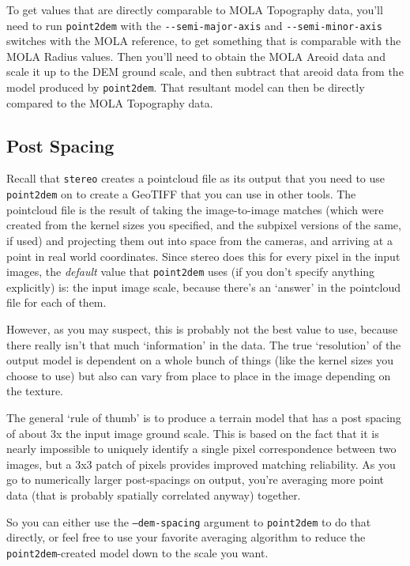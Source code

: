 To get values that are directly comparable to MOLA Topography data,
you'll need to run \texttt{point2dem} with the \texttt{-\/-semi-major-axis}
and \texttt{-\/-semi-minor-axis} switches with the MOLA reference, to get
something that is comparable with the MOLA Radius values.  Then you'll need
to obtain the MOLA Areoid data and scale it up to the DEM ground scale, and then
subtract that areoid data from the model produced by \texttt{point2dem}.  That
resultant model can then be directly compared to the MOLA Topography data.

\subsection{Post Spacing}

Recall that \texttt{stereo} creates a pointcloud file as its output
that you need to use \texttt{point2dem} on to create a GeoTIFF that
you can use in other tools.  The pointcloud file is the result of
taking the image-to-image matches (which were created from the
kernel sizes you specified, and the subpixel versions of the same,
if used) and projecting them out into space from the cameras, and
arriving at a point in real world coordinates.  Since stereo does
this for every pixel in the input images, the \textit{default} value that
\texttt{point2dem} uses (if you don't specify anything explicitly) is: the
input image scale, because there's an `answer' in the pointcloud
file for each of them.

However, as you may suspect, this is probably not the best value to
use, because there really isn't that much `information' in the data.
The true `resolution' of the output model is dependent on a whole
bunch of things (like the kernel sizes you choose to use) but also can
vary from place to place in the image depending on the texture.

The general `rule of thumb' is to produce a terrain model that has a
post spacing of about 3x the input image ground scale.  This is based
on the fact that it is nearly impossible to uniquely identify a single
pixel correspondence between two images, but a 3x3 patch of pixels
provides improved matching reliability.  As you go to numerically
larger post-spacings on output, you're averaging more point data (that
is probably spatially correlated anyway) together.

So you can either use the \texttt{--dem-spacing} argument to
\texttt{point2dem} to do that directly, or feel free to use your
favorite averaging algorithm to reduce the \texttt{point2dem}-created
model down to the scale you want.

